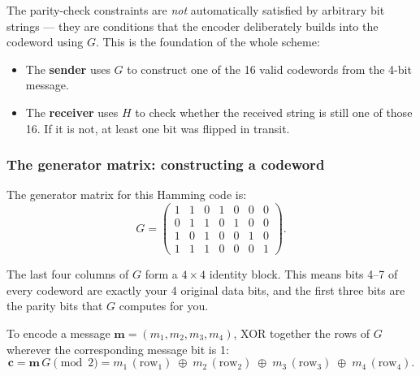 \documentclass[11pt, a4paper]{article}
\theoremstyle{definition}
\theoremstyle{plain}
\theoremstyle{remark}
\begin{document}
The parity-check constraints are \emph{not} automatically satisfied
by arbitrary bit strings --- they are conditions that the encoder
deliberately builds into the codeword using $G$.  This is the
foundation of the whole scheme:
\begin{itemize}
  \item The \textbf{sender} uses $G$ to construct one of the 16 valid
        codewords from the 4-bit message.
  \item The \textbf{receiver} uses $H$ to check whether the received
        string is still one of those 16.  If it is not, at least one
        bit was flipped in transit.
\end{itemize}

\subsubsection{The generator matrix: constructing a codeword}

The generator matrix for this Hamming code is:
\[
  G = \begin{pmatrix}
    1 & 1 & 0 & 1 & 0 & 0 & 0 \\
    0 & 1 & 1 & 0 & 1 & 0 & 0 \\
    1 & 0 & 1 & 0 & 0 & 1 & 0 \\
    1 & 1 & 1 & 0 & 0 & 0 & 1
  \end{pmatrix}.
\]

The last four columns of $G$ form a $4\times4$ identity block.  This
means bits 4--7 of every codeword are exactly your 4 original data
bits, and the first three bits are the parity bits that $G$ computes
for you.

To encode a message $\mathbf{m} = (m_1, m_2, m_3, m_4)$, XOR together
the rows of $G$ wherever the corresponding message bit is 1:
\[
  \mathbf{c}
  = \mathbf{m}\,G \pmod{2}
  = m_1\,(\text{row}_1) \;\oplus\;
    m_2\,(\text{row}_2) \;\oplus\;
    m_3\,(\text{row}_3) \;\oplus\;
    m_4\,(\text{row}_4).
\]
\end{document}

